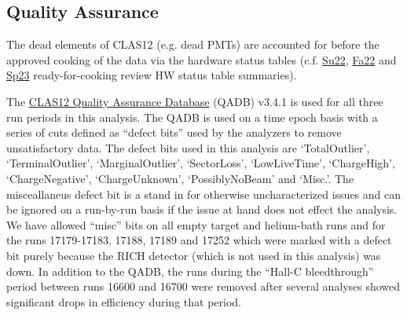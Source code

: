 \subsection{Quality Assurance}
\label{sec::QADB}

The dead elements of CLAS12 (e.g. dead PMTs) are accounted for before the approved cooking of the data via the hardware status tables (c.f. \href{https://clasweb.jlab.org/wiki/images/8/8d/Statustables_RGCSummer2022review2024.pdf}{Su22}, \href{https://clasweb.jlab.org/wiki/images/archive/9/96/20240828040441%21Statustables_RGCFall2022review2024.pdf}{Fa22} and \href{https://clasweb.jlab.org/wiki/images/d/dd/Statustables_RGCWinter2023review2025.pdf}{Sp23} ready-for-cooking review HW status table summaries).

The \href{https://github.com/JeffersonLab/clas12-qadb}{CLAS12 Quality Assurance Database} (QADB) v3.4.1 is used for all three run periods in this analysis. The QADB is used on a time epoch basis with a series of cuts defined as ``defect bits'' used by the analyzers to remove unsatisfactory data. The defect bits used in this analysis are `TotalOutlier', `TerminalOutlier', `MarginalOutlier', `SectorLoss', `LowLiveTime', `ChargeHigh', `ChargeNegative', `ChargeUnknown', `PossiblyNoBeam' and `Misc.'. The misceallaneus defect bit is a stand in for otherwise uncharacterized issues and can be ignored on a run-by-run basis if the issue at hand does not effect the analysis. We have allowed ``misc'' bits on all empty target and helium-bath runs and for the runs 17179-17183, 17188, 17189 and 17252 which were marked with a defect bit purely because the RICH detector (which is not used in this analysis) was down. In addition to the QADB, the runs during the ``Hall-C bleedthrough'' period between runs 16600 and 16700 were removed after several analyses showed significant drops in efficiency during that period.


